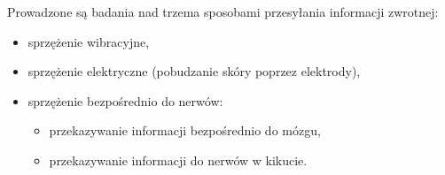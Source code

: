 \documentclass[8pt]{beamer}
\begin{document}
		\begin{frame}
			Prowadzone są badania nad trzema sposobami przesyłania informacji zwrotnej:
			\begin{itemize}[<+->]
				\item sprzężenie wibracyjne,
				\item sprzężenie elektryczne (pobudzanie skóry poprzez elektrody),
				\item sprzężenie bezpośrednio do nerwów:
				\begin{itemize}[<+->]
					\item przekazywanie informacji bezpośrednio do mózgu,
					\item przekazywanie informacji do nerwów w kikucie.
				\end{itemize}
			\end{itemize}
		\end{frame}
		
\end{document}
